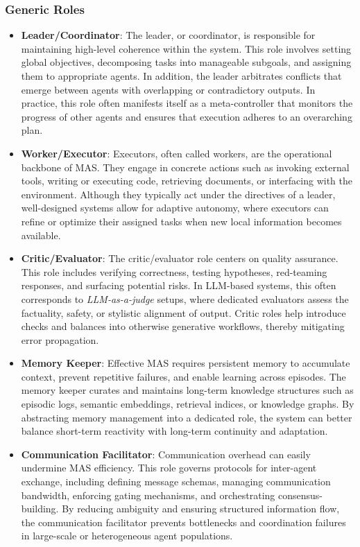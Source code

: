 \subsubsection{Generic Roles}
\begin{itemize}[leftmargin=1.2em]
\item \textbf{Leader/Coordinator}: 
The leader, or coordinator, is responsible for maintaining high-level coherence within the system. 
This role involves setting global objectives, decomposing tasks into manageable subgoals, and assigning them to appropriate agents.
In addition, the leader arbitrates conflicts that emerge between agents with overlapping or contradictory outputs. 
In practice, this role often manifests itself as a meta-controller that monitors the progress of other agents and ensures that execution adheres to an overarching plan.
\item \textbf{Worker/Executor}: 
Executors, often called workers, are the operational backbone of MAS. They engage in concrete actions such as invoking external tools, writing or executing code, retrieving documents, or interfacing with the environment. 
Although they typically act under the directives of a leader, well-designed systems allow for adaptive autonomy, 
where executors can refine or optimize their assigned tasks when new local information becomes available.
\item \textbf{Critic/Evaluator}: 
The critic/evaluator role centers on quality assurance. This role includes verifying correctness, testing hypotheses, red-teaming responses, and surfacing potential risks. In LLM-based systems, this often corresponds to \emph{LLM-as-a-judge} setups, where dedicated evaluators assess the factuality, safety, or stylistic alignment of output. Critic roles help introduce checks and balances into otherwise generative workflows, thereby mitigating error propagation.
\item \textbf{Memory Keeper}: 
Effective MAS requires persistent memory to accumulate context, prevent repetitive failures, and enable learning across episodes. 
The memory keeper curates and maintains long-term knowledge structures such as episodic logs, semantic embeddings, retrieval indices, or knowledge graphs. 
By abstracting memory management into a dedicated role, the system can better balance short-term reactivity with long-term continuity and adaptation.
\item \textbf{Communication Facilitator}:
Communication overhead can easily undermine MAS efficiency. 
This role governs protocols for inter-agent exchange, including defining message schemas, managing communication bandwidth, enforcing gating mechanisms, and orchestrating consensus-building. 
By reducing ambiguity and ensuring structured information flow, the communication facilitator prevents bottlenecks and coordination failures in large-scale or heterogeneous agent populations.
\end{itemize}


